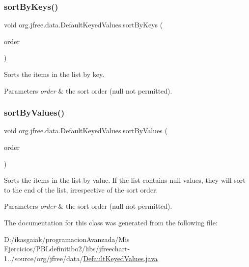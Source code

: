 \subsubsection{\texorpdfstring{sort\+By\+Keys()}{sortByKeys()}}
{\footnotesize\ttfamily void org.\+jfree.\+data.\+Default\+Keyed\+Values.\+sort\+By\+Keys (\begin{DoxyParamCaption}\item[{Sort\+Order}]{order }\end{DoxyParamCaption})}

Sorts the items in the list by key.


\begin{DoxyParams}{Parameters}
{\em order} & the sort order ({\ttfamily null} not permitted). \\
\hline
\end{DoxyParams}
\mbox{\label{classorg_1_1jfree_1_1data_1_1_default_keyed_values_a8b8d4680b4079d7c191ee9af47db60db}} 
\subsubsection{\texorpdfstring{sort\+By\+Values()}{sortByValues()}}
{\footnotesize\ttfamily void org.\+jfree.\+data.\+Default\+Keyed\+Values.\+sort\+By\+Values (\begin{DoxyParamCaption}\item[{Sort\+Order}]{order }\end{DoxyParamCaption})}

Sorts the items in the list by value. If the list contains {\ttfamily null} values, they will sort to the end of the list, irrespective of the sort order.


\begin{DoxyParams}{Parameters}
{\em order} & the sort order ({\ttfamily null} not permitted). \\
\hline
\end{DoxyParams}


The documentation for this class was generated from the following file\+:\begin{DoxyCompactItemize}
\item 
D\+:/ikasgaiak/programacion\+Avanzada/\+Mis Ejercicios/\+P\+B\+Ldefinitibo2/libs/jfreechart-\/1../source/org/jfree/data/\mbox{\hyperlink{_default_keyed_values_8java}{Default\+Keyed\+Values.\+java}}\end{DoxyCompactItemize}
